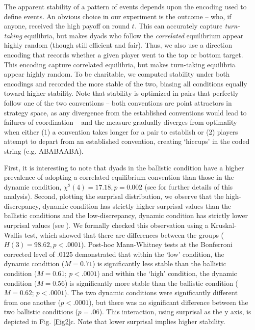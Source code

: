 \documentclass[10pt,letterpaper]{article}
\begin{document}
The apparent stability of a pattern of events depends upon the encoding used to define events. An obvious choice in our experiment is the outcome -- who, if anyone, received the high payoff on round $t$. This can accurately capture \emph{turn-taking} equilibria, but makes dyads who follow the \emph{correlated} equilibrium appear highly random (though still efficient and fair). Thus, we also use a direction encoding that records whether a given player went to the top or bottom target. This encoding capture correlated equilibria, but makes turn-taking equilibria appear highly random. To be charitable, we computed stability under both encodings and recorded the more stable of the two, biasing all conditions equally toward higher stability. Note that stability is optimized in pairs that perfectly follow one of the two conventions -- both conventions are point attractors in strategy space, as any divergence from the established conventions would lead to failures of coordination -- and the measure gradually diverges from optimality when either (1) a convention takes longer for a pair to establish or (2) players attempt to depart from an established convention, creating `hiccups' in the coded string (e.g. ABABAABA).

First, it is interesting to note that dyads in the ballistic condition have a higher prevalence of adopting a correlated equilibrium convention than those in the dynamic condition, $\chi^2(4) = 17.18, p = 0.002$ (see  for further details of this analysis). Second, plotting the surprisal distribution, we observe that the high-discrepancy, dynamic condition has strictly higher surprisal values than the ballistic conditions and the low-discrepancy, dynamic condition has strictly lower surprisal values  (see ). We formally checked this observation using a Kruskal-Wallis test, which showed that there are differences between the groups ($H(3) = 98.62, p < .0001$). Post-hoc Mann-Whitney tests at the Bonferroni corrected level of .0125 demonstrated that within the `low' condition, the dynamic condition ($M = 0.71$) is significantly less stable than the ballistic condition ($M=0.61$; $p < .0001$) and within the `high' condition, the dynamic condition ($M=0.56$) is significantly more stable than the ballistic condition ($M=0.62$; $p < .0001$). The two dynamic conditions were significantly different from one another ($p < .0001$), but there was no significant difference between the two ballistic conditions ($p = .06$). This interaction, using surprisal as the y axis, is depicted in Fig. \ref{Fig2}c. Note that lower surprisal implies higher stability.
\end{document}

